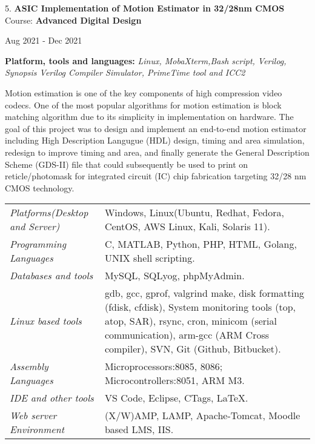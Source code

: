\documentclass[10pt]{article}
\renewcommand{\section}[2]%
        {\pagebreak[3]\vspace{1.3\baselineskip}%
         \phantomsection\addcontentsline{toc}{section}{#1}%
         \hspace{0in}%
         \marginpar{
         \raggedright \scshape #1}#2}
\newenvironment{innerlist}[1][\enskip\textbullet]%
        {\begin{compactitem}[#1]}{\end{compactitem}}
\newenvironment{loneinnerlist}[1][\enskip\textbullet]%
        {\vspace{-\baselineskip}\begin{compactitem}[#1]}
        {\end{compactitem}\vspace{-.6\baselineskip}}
\begin{document}
\begin{loneinnerlist}
\item[5.]\textbf{ASIC Implementation of Motion Estimator in 32/28nm CMOS} \\ 
\vspace{4pt}
Course: \textbf{Advanced Digital Design} \\
\vspace*{-28pt} \begin{flushright} Aug 2021 - Dec 2021 \end{flushright}
\textbf{Platform, tools and languages:} \emph{Linux, MobaXterm,Bash script, Verilog, Synopsis Verilog Compiler Simulator, PrimeTime tool and ICC2}
\vspace*{2pt}
\begin{innerlist} \item Motion estimation is one of the key components of high compression video codecs. One of the most popular algorithms for motion estimation is block matching algorithm due to its simplicity in implementation on hardware. The goal of this project was to design and implement an end-to-end motion estimator including High Description Langugue (HDL) design, timing and area simulation, redesign to improve timing and area, and finally generate the General Description Scheme (GDS-II) file that could subsequently be used to print on reticle/photomask for integrated circuit (IC) chip fabrication targeting 32/28 nm CMOS technology.
\end{innerlist}  \vspace*{4pt}
\end{loneinnerlist}%


\section{Skills}
%
\begin{tabular}[t]{l p{2.9in}}
\emph{Platforms(Desktop and Server)}  &  Windows, Linux(Ubuntu, Redhat, Fedora, CentOS, AWS Linux, Kali, Solaris 11).\\
\emph{Programming Languages}  & C, MATLAB, Python, PHP, HTML, Golang, UNIX shell scripting.\\
\emph{Databases and tools}  & MySQL, SQLyog, phpMyAdmin.\\
\emph{Linux based tools}  &  gdb, gcc, gprof, valgrind make, disk formatting (fdisk, cfdisk), System monitoring tools (top, atop, SAR), rsync, cron, minicom (serial communication), arm-gcc (ARM Cross compiler), SVN, Git (Github, Bitbucket).\\
\emph{Assembly Languages}  &  Microprocessors:8085, 8086; Microcontrollers:8051, ARM M3.\\
\emph{IDE and other tools}  & VS Code, Eclipse, CTags, \LaTeX{}.\\
\emph{Web server Environment}  & (X/W)AMP, LAMP, Apache-Tomcat, Moodle based LMS, IIS.\\
\end{tabular}
\end{document}
